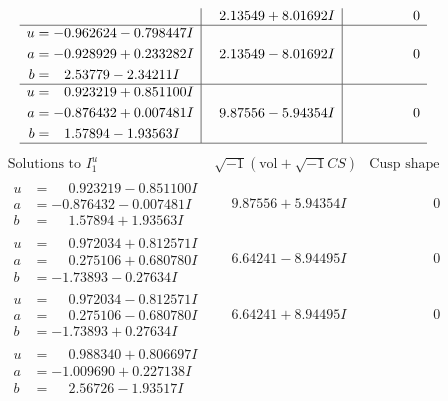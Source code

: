 \documentclass[1p]{elsarticle_modified}
\theoremstyle{definition}
\newcommand{\I}{\sqrt{-1}}
\begin{document}
$$\begin{array}{c|c|c}
 & \phantom{-}2.13549 + 8.01692 I & \phantom{-0.000000 } 0 \\ \hline\begin{aligned}
u &= -0.962624 - 0.798447 I \\
a &= -0.928929 + 0.233282 I \\
b &= \phantom{-}2.53779 - 2.34211 I\end{aligned}
 & \phantom{-}2.13549 - 8.01692 I & \phantom{-0.000000 } 0 \\ \hline\begin{aligned}
u &= \phantom{-}0.923219 + 0.851100 I \\
a &= -0.876432 + 0.007481 I \\
b &= \phantom{-}1.57894 - 1.93563 I\end{aligned}
 & \phantom{-}9.87556 - 5.94354 I & \phantom{-0.000000 } 0\\
 \hline 
 \end{array}$$\newpage$$\begin{array}{c|c|c}  
\text{Solutions to }I^u_{1}& \I (\text{vol} + \sqrt{-1}CS) & \text{Cusp shape}\\
 \hline 
\begin{aligned}
u &= \phantom{-}0.923219 - 0.851100 I \\
a &= -0.876432 - 0.007481 I \\
b &= \phantom{-}1.57894 + 1.93563 I\end{aligned}
 & \phantom{-}9.87556 + 5.94354 I & \phantom{-0.000000 } 0 \\ \hline\begin{aligned}
u &= \phantom{-}0.972034 + 0.812571 I \\
a &= \phantom{-}0.275106 + 0.680780 I \\
b &= -1.73893 - 0.27634 I\end{aligned}
 & \phantom{-}6.64241 - 8.94495 I & \phantom{-0.000000 } 0 \\ \hline\begin{aligned}
u &= \phantom{-}0.972034 - 0.812571 I \\
a &= \phantom{-}0.275106 - 0.680780 I \\
b &= -1.73893 + 0.27634 I\end{aligned}
 & \phantom{-}6.64241 + 8.94495 I & \phantom{-0.000000 } 0 \\ \hline\begin{aligned}
u &= \phantom{-}0.988340 + 0.806697 I \\
a &= -1.009690 + 0.227138 I \\
b &= \phantom{-}2.56726 - 1.93517 I\end{aligned}

\end{array}$$
\end{document}
